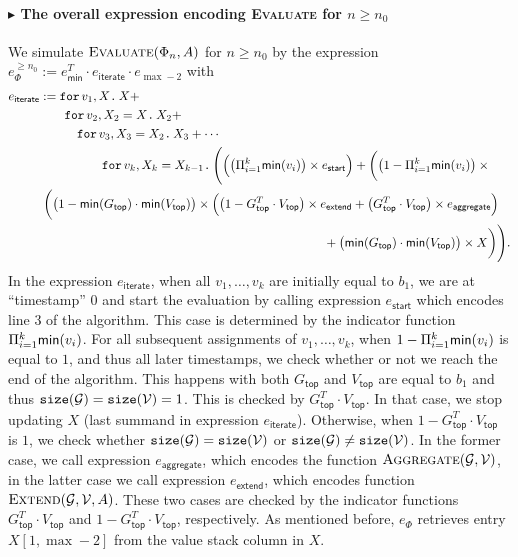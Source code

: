\paragraph{$\blacktriangleright$ The overall expression encoding {\normalfont \textsc{Evaluate}} for $n\geq n_0$}
We simulate $\textsc{Evaluate}(\Phi_n,A)$ for $n\geq n_0$ by the expression
$e_{\Phi}^{\geq n_0}:= e_{\mathsf{min}}^T\cdot e_{\mathsf{iterate}}\cdot e_{\max -2}$ with
    \begin{align*}\allowdisplaybreaks
		e_{\mathsf{iterate}}&:= \ffor{v_1}{X} X+\\
		& \qquad\ffor{v_2}{X_2=X} X_2+ \\
		& \qquad \quad \ffor{v_3}{X_3=X_2} X_3+ \cdots\\
		& \qquad \qquad\quad \ffor{v_k}{X_{k}=X_{k-1}} \Biggl(\Bigl(\bigl( \sprod_{i=1}^k \mathsf{min}(v_i)\bigr) \times e_{\mathsf{start}}\Bigr) + 
        \biggl( \bigl(1- \sprod_{i=1}^k \mathsf{min}(v_i)\bigr)\times{}\\
        &\hspace{0.3em} \biggl( \bigl(1 -\mathsf{min}(G_{\mathsf{top}})\cdot \mathsf{min}(V_{\mathsf{top}})\bigr) \times \Bigl(\bigl( 1 - G_{\mathsf{top}}^T\cdot V_{\mathsf{top}}\bigr) \times e_{\mathsf{extend}} + 
        \bigl(G_{\mathsf{top}}^T\cdot V_{\mathsf{top}}\bigr) \times e_{\mathsf{aggregate}}\Bigl)  \\
        &\hspace{8cm}+\bigl(\mathsf{min}(G_{\mathsf{top}})\cdot \mathsf{min}(V_{\mathsf{top}})\bigr)\times X\biggr)\Biggr).
	   \end{align*}
In the expression $e_{\mathsf{iterate}}$, when all $v_1,\ldots,v_k$ are initially equal to $b_1$, we are at ``timestamp'' $0$ and start the evaluation by 
calling expression $e_{\mathsf{start}}$ which encodes line 3 of the algorithm. This case is determined by the indicator function
$ \Pi_{i=1}^k \mathsf{min}(v_i)$. For all subsequent assignments of $v_1,\ldots,v_k$, when $1- \Pi_{i=1}^k \mathsf{min}(v_i)$ is equal to $1$, and thus all
later timestamps, we check whether or not we reach the end of the algorithm. This happens with both $G_{\mathsf{top}}$ and $V_{\mathsf{top}}$ are equal to $b_1$
and thus $\texttt{size}(\mathcal{G})=\texttt{size}(\mathcal{V})=1$. This is checked by $G_{\mathsf{top}}^T\cdot V_{\mathsf{top}}$.
In that case, we stop updating $X$ (last summand in expression $e_{\mathsf{iterate}}$). Otherwise, when $1-G_{\mathsf{top}}^T\cdot V_{\mathsf{top}}$ is $1$, we check whether $\texttt{size}(\mathcal{G})=\texttt{size}(\mathcal{V})$ or $\texttt{size}(\mathcal{G})\neq \texttt{size}(\mathcal{V})$. In the former case, we call expression $e_{\mathsf{aggregate}}$, which encodes the function $\textsc{Aggregate}(\mathcal{G},\mathcal{V})$, in the latter case we call expression $e_{\mathsf{extend}}$, which encodes function $\textsc{Extend}(\mathcal{G},\mathcal{V},A)$. These two cases are checked by the indicator functions $G_{\mathsf{top}}^T\cdot V_{\mathsf{top}}$ and  $1 - G_{\mathsf{top}}^T\cdot V_{\mathsf{top}}$, respectively. As mentioned before, $e_\Phi$ retrieves entry $X[1,\max-2]$ from the value stack column in $X$. 
